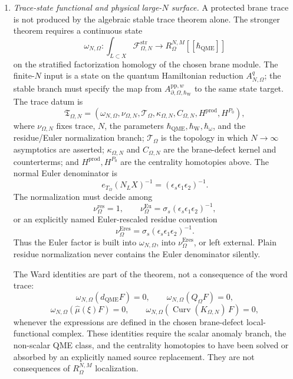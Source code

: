 \begin{enumerate}
  \item \emph{Trace-state functional and physical large-\(N\) surface.}
  A protected brane trace is not produced by the algebraic stable trace
  theorem alone.  The stronger theorem requires a continuous state
  \[
    \omega_{N,\Omega}\colon
    \int_{L\subset X}\mathcal F^{\mathrm{str}}_{\Omega,N}
    \longrightarrow
    R_\Omega^{N,M}[[\hbar_{\mathrm{QME}}]]
  \]
  on the stratified factorization homology of the chosen brane module.
  The finite-\(N\) input is a state on the quantum Hamiltonian reduction
  \(A^q_{N,\Omega}\); the stable branch must specify the map from
  \(A^{\mathrm{pp},w}_{\partial,\Omega,\hbar_{\mathrm{W}}}\) to the same state target.
  The trace datum is
  \[
    \mathfrak T_{\Omega,N}
    =
    (\omega_{N,\Omega},
     \nu_{\Omega,N},
     \mathcal T_\Omega,
     \kappa_{\Omega,N},
     C_{\Omega,N},
     H^{\mathrm{prod}},
     H^{P_0}),
  \]
  where \(\nu_{\Omega,N}\) fixes trace, \(N\), the parameters
  \(\hbar_{\mathrm{QME}},\hbar_{\mathrm{W}},\hbar_\omega\), and the
  residue/Euler normalization branch; \(\mathcal T_\Omega\) is the
  topology in which \(N\to\infty\) asymptotics are asserted;
  \(\kappa_{\Omega,N}\) and \(C_{\Omega,N}\) are the brane-defect kernel
  and counterterms; and \(H^{\mathrm{prod}},H^{P_0}\) are the centrality
  homotopies above.  The normal Euler denominator is
  \[
    e_{T_\Omega}(N_LX)^{-1}
      =
      (\epsilon_s\epsilon_1\epsilon_2)^{-1}.
  \]
  The normalization must decide among
  \[
    \nu_\Omega^{\mathrm{res}}=1,\qquad
    \nu_\Omega^{\mathrm{Eu}}
      =
      \sigma_s(\epsilon_s\epsilon_1\epsilon_2)^{-1},
  \]
  or an explicitly named Euler-rescaled residue convention
  \[
    \nu_\Omega^{\mathrm{Eres}}
      =
      \sigma_s(\epsilon_s\epsilon_1\epsilon_2)^{-1}.
  \]
  Thus the Euler factor is built into \(\omega_{N,\Omega}\), into
  \(\nu_\Omega^{\mathrm{Eres}}\), or left external.  Plain residue
  normalization never contains the Euler denominator silently.

  The Ward identities are part of the theorem, not a consequence of the
  word trace:
  \[
    \omega_{N,\Omega}(d_{\mathrm{QME}}F)=0,\qquad
    \omega_{N,\Omega}(Q_\Omega F)=0,
  \]
  \[
    \omega_{N,\Omega}(\widehat\mu(\xi)F)=0,\qquad
    \omega_{N,\Omega}(\operatorname{Curv}(K_{\Omega,N})\,F)=0,
  \]
  whenever the expressions are defined in the chosen brane-defect
  local-functional complex.  These identities require the scalar
  anomaly branch, the non-scalar QME class, and the centrality
  homotopies to have been solved or absorbed by an explicitly named
  source replacement.  They are not consequences of \(R_\Omega^{N,M}\)
  localization.


\end{enumerate}
